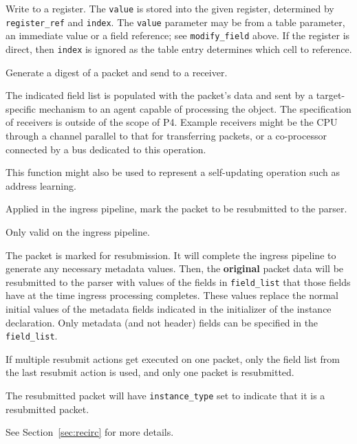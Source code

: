 \documentclass[12pt]{article}
\begin{document}

{ %
Write to a register.
}
{ %
}
{ %
The \texttt{value} is stored into the given register, determined by \texttt{register_ref} and \texttt{index}.
The \texttt{value} parameter 
may be from a table parameter, an immediate value or a field reference; see \texttt{modify_field} above. 
If the register is direct, then \texttt{index} is ignored as the table entry determines which 
cell to reference. 
}


{ %
Generate a digest of a packet and send to a receiver.
}
{ %
}
{ %
The indicated field list is populated with the packet's data and sent by 
a target-specific mechanism to an agent capable of processing the object. 
 The specification of receivers is outside of the scope of P4. Example receivers 
might be the CPU through a channel parallel to that for transferring packets, 
or a co-processor connected by a bus dedicated to this operation. 

This function might also be used to represent a self-updating operation such 
as address learning.
}


{%
Applied in the ingress pipeline, mark the packet to be resubmitted to the 
parser.
}
{ %
}
{ %
Only valid on the ingress pipeline.

The packet is marked for resubmission. It will complete the ingress pipeline 
to generate any necessary metadata values. Then, the \textbf{original} packet data 
will be resubmitted to the parser with values of the fields in \texttt{field_list}
that those fields have at the time ingress processing completes.
These values replace the normal initial
values of the metadata fields indicated in the initializer of the instance 
declaration. Only metadata (and not header) fields can be specified in the \texttt{field_list}.

If multiple resubmit actions get executed on one packet, only the
field list from the last resubmit action is used, and only one packet
is resubmitted.

The resubmitted packet will have \texttt{instance_type} set to
indicate that it is a resubmitted packet.

See Section~\ref{sec:recirc} for more details.

}
\end{document}
